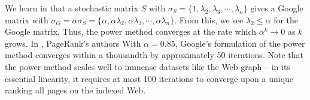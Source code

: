 \documentclass[../exploring-pagerank.tex]{subfiles}
\begin{document}
    We learn in \cite{haveliwalaSecondEigenvalueGoogle} that a stochastic matrix $S$ with $\sigma_S = \{ 1, \lambda_2, \lambda_3, \cdots, \lambda_n \}$ gives a Google matrix with $\sigma_G = \alpha\sigma_S = \{ \alpha, \alpha\lambda_2, \alpha\lambda_3, \cdots, \alpha\lambda_n \}$. From this, we see $\lambda_2 \leq \alpha$ for the Google matrix. Thus, the power method converges at the rate which $\alpha^k \to 0$ as $k$ grows. In \cite{brinPageRankCitationRanking1998}, PageRank's authors With $\alpha = 0.85$, Google's formulation of the power method converges within a thousandth by approximately 50 iterations. Note that the power method scales well to immense datasets like the Web graph -- in its essential linearity, it requires at most 100 iterations to converge upon a unique ranking all pages on the indexed Web.
\end{document}
